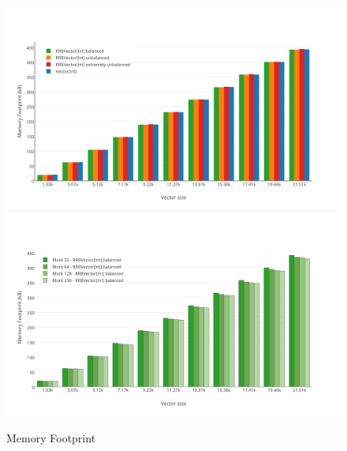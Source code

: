 \begin{figure}[h!]
  \centering
  \includegraphics[width=\textwidth]{Benchmarks/Memory_3.pdf}
  \includegraphics[width=\textwidth]{Benchmarks/Memory_blocks.pdf}
  \label{MemoryFootprints}
  \caption{Memory Footprint}
\end{figure}



